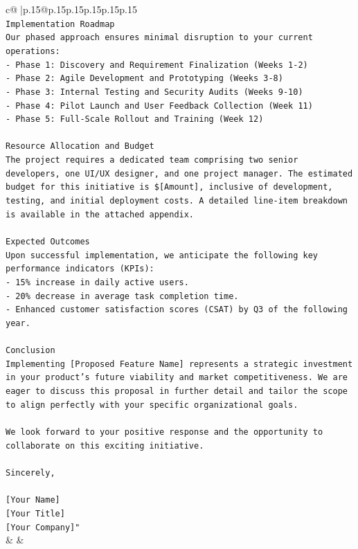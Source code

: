 \documentclass{article}
\begin{document}
{\begin{supertabular}{c@{$\;$}|p{.15\linewidth}@{}p{.15\linewidth}p{.15\linewidth}p{.15\linewidth}p{.15\linewidth}p{.15\linewidth}}
{{{\\ 
\texttt{Implementation Roadmap} \\
\texttt{Our phased approach ensures minimal disruption to your current operations:} \\
\texttt{{-} Phase 1: Discovery and Requirement Finalization (Weeks 1{-}2)} \\
\texttt{{-} Phase 2: Agile Development and Prototyping (Weeks 3{-}8)} \\
\texttt{{-} Phase 3: Internal Testing and Security Audits (Weeks 9{-}10)} \\
\texttt{{-} Phase 4: Pilot Launch and User Feedback Collection (Week 11)} \\
\texttt{{-} Phase 5: Full{-}Scale Rollout and Training (Week 12)} \\
\\ 
\texttt{Resource Allocation and Budget} \\
\texttt{The project requires a dedicated team comprising two senior developers, one UI/UX designer, and one project manager. The estimated budget for this initiative is \${[}Amount{]}, inclusive of development, testing, and initial deployment costs. A detailed line{-}item breakdown is available in the attached appendix.} \\
\\ 
\texttt{Expected Outcomes} \\
\texttt{Upon successful implementation, we anticipate the following key performance indicators (KPIs):} \\
\texttt{{-} 15\% increase in daily active users.} \\
\texttt{{-} 20\% decrease in average task completion time.} \\
\texttt{{-} Enhanced customer satisfaction scores (CSAT) by Q3 of the following year.} \\
\\ 
\texttt{Conclusion} \\
\texttt{Implementing {[}Proposed Feature Name{]} represents a strategic investment in your product's future viability and market competitiveness. We are eager to discuss this proposal in further detail and tailor the scope to align perfectly with your specific organizational goals.} \\
\\ 
\texttt{We look forward to your positive response and the opportunity to collaborate on this exciting initiative.} \\
\\ 
\texttt{Sincerely,} \\
\\ 
\texttt{{[}Your Name{]}} \\
\texttt{{[}Your Title{]}} \\
\texttt{{[}Your Company{]}"} \\
            }
        }
    }
    & & \\ \\


\end{supertabular}}
\end{document}
